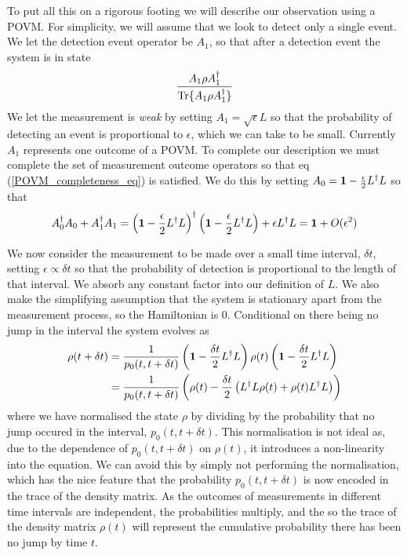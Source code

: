 To put all this on a rigorous footing we will describe our observation using a POVM. For simplicity, we will assume that we look to detect only a single  event. We let the detection event operator be $A_1$, so that after a detection event the system is in state
\begin{align}
  \frac{A_1 \rho A_1^\dagger}{\operatorname{Tr}\{A_1 \rho A_1^\dagger\}}
\end{align}
We let the measurement is \textit{weak} by setting $A_1 = \sqrt{\epsilon} L$ so that the probability of detecting an event is proportional to $\epsilon$, which we can take to be small. Currently $A_1$ represents one outcome of a POVM. To complete our description we must complete the set of measurement outcome operators so that eq (\ref{POVM_completeness_eq}) is satisfied. We do this by setting $A_0 = \mathbf{1} - \frac{\epsilon}{2} L^\dagger L$ so that
\begin{align}
  A_0^\dagger A_0 + A_1^\dagger A_1 = \left( \mathbf{1} - \frac{\epsilon}{2} L^\dagger L\right)^\dagger \left( \mathbf{1} - \frac{\epsilon}{2} L^\dagger L\right) + \epsilon L^\dagger L = \mathbf{1} + O(\epsilon^2)
\end{align}

We now consider the measurement to be made over a small time interval, $\delta t$, setting $\epsilon \propto \delta t$ so that the probability of detection is proportional to the length of that interval. We absorb any constant factor into our definition of $L$. We also make the simplifying assumption that the system is stationary apart from the measurement process, so the Hamiltonian is $0$. Conditional on there being no jump in the interval the system evolves as
\begin{align}
  \rho(t+\delta t) &= \frac{1}{p_0(t, t+\delta t)}\left(\mathbf{1} - \frac{\delta t}{2} L^\dagger L\right)\rho(t)\left(\mathbf{1} - \frac{\delta t}{2} L^\dagger L\right) \\
  &= \frac{1}{p_0(t, t+\delta t)}\left(\rho(t) - \frac{\delta t}{2} \left(L^\dagger L \rho(t) + \rho(t) L^\dagger L \right)\right)
\end{align}
where we have normalised the state $\rho$ by dividing by the probability that no jump occured in the interval, $p_0(t, t+\delta t)$. This normalisation is not ideal as, due to the dependence of $p_0(t, t+\delta t)$ on $\rho(t)$, it introduces a non-linearity into the equation. We can avoid this by simply not performing the normalisation, which has the nice feature that the probability $p_0(t, t+\delta t)$ is now encoded in the trace of the density matrix. As the outcomes of measurements in different time intervals are independent, the probabilities multiply, and the so the trace of the density matrix $\rho(t)$ will represent the cumulative probability there has been no jump by time $t$.

